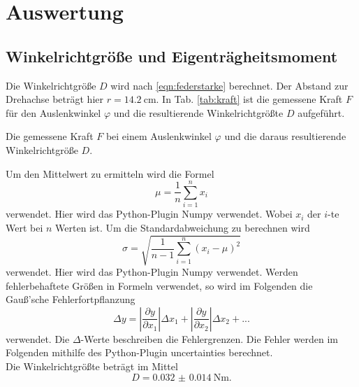 \section{Auswertung}
\label{sec:Auswertung}
\subsection{Winkelrichtgröße und Eigenträgheitsmoment}
Die Winkelrichtgröße $D$ wird nach \eqref{eqn:federstarke}
berechnet.
Der Abstand zur Drehachse beträgt hier $r=\SI{14.2}{\centi\metre}$.
In Tab. \ref{tab:kraft} ist die gemessene Kraft $F$ für den Auslenkwinkel $\varphi$ und die resultierende Winkelrichtgrößte $D$ aufgeführt.
\begin{table}
    \centering
    \caption{Die gemessene Kraft $F$ bei einem Auslenkwinkel $\varphi$ und die daraus resultierende Winkelrichtgröße $D$.}
    \label{tab:kraft}  
\end{table}
\FloatBarrier
Um den Mittelwert zu ermitteln wird die Formel
\begin{equation}
    \mu = \frac{1}{n} \sum_{i=1}^n x_i
\end{equation}
verwendet. Hier wird das Python-Plugin Numpy \cite{numpy} verwendet.
Wobei $x_i$ der $i$-te Wert bei $n$ Werten ist.
Um die Standardabweichung zu berechnen wird
\begin{equation}
    \sigma = \sqrt{\frac{1}{n-1} \sum_{i=1}^n (x_i - \mu)^2}
\end{equation}
verwendet. Hier wird das Python-Plugin Numpy \cite{numpy} verwendet.
Werden fehlerbehaftete Größen in Formeln verwendet, so wird im Folgenden die Gauß'sche Fehlerfortpflanzung 
\begin{equation}
    \Delta y = \left|\frac{\partial y}{\partial x_1}\right| \Delta x_1 + \left|\frac{\partial y}{\partial x_2}\right| \Delta x_2 + ...
\end{equation}
verwendet. Die $\Delta$-Werte beschreiben die Fehlergrenzen.
Die Fehler werden im Folgenden mithilfe des Python-Plugin uncertainties \cite{uncertainties} berechnet.
\\
Die Winkelrichtgrößte beträgt im Mittel
\begin{equation*}
    D = \SI{0.032(14)}{\newton\metre} .
\end{equation*}
